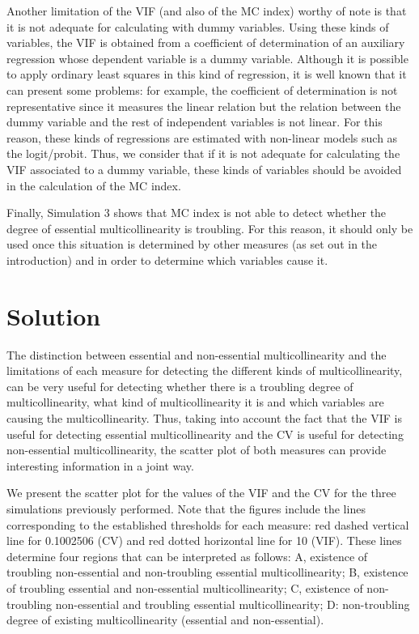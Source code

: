 Another limitation of the VIF (and also of the MC index) worthy of note is that it is not adequate for calculating with dummy variables. Using these kinds of variables, the VIF is obtained from a coefficient of determination of an auxiliary regression whose dependent variable is a dummy variable. Although it is possible to apply ordinary least squares in this kind of regression, it is well known that it can present some problems: for example, the coefficient of determination is not representative since it measures the linear relation but the relation between the dummy variable and the rest of independent variables is not linear. For this reason, these kinds of regressions are estimated with non-linear models such as the logit/probit. Thus, we consider that if it is not adequate for calculating the VIF associated to a dummy variable, these kinds of variables should be avoided in the calculation of the MC index.

Finally, Simulation 3 shows that MC index is not able to detect whether the degree of essential multicollinearity is troubling. For this reason, it should only be used once this situation is determined by other measures (as set out in the introduction) and in order to determine which variables cause it.

\hypertarget{solution}{%
\section{Solution}\label{solution}}

The distinction between essential and non-essential multicollinearity and the limitations of each measure for detecting the different kinds of multicollinearity, can be very useful for detecting whether there is a troubling degree of multicollinearity, what kind of multicollinearity it is and which variables are causing the multicollinearity. Thus, taking into account the fact that the VIF is useful for detecting essential multicollinearity and the CV is useful for detecting non-essential multicollinearity, the scatter plot of both measures can provide interesting information in a joint way.

We present the scatter plot for the values of the VIF and the CV for the three simulations previously performed. Note that the figures include the lines corresponding to the established thresholds for each measure: red dashed vertical line for 0.1002506 (CV) and red dotted horizontal line for 10 (VIF). These lines determine four regions that can be interpreted as follows: A, existence of troubling non-essential and non-troubling essential multicollinearity; B, existence of troubling essential and non-essential multicollinearity; C, existence of non-troubling non-essential and troubling essential multicollinearity; D: non-troubling degree of existing multicollinearity (essential and non-essential).


